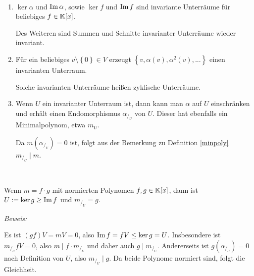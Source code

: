 \begin{mylemma} \label{lemdef3.2}\

    \begin{enumerate}
        \item $\ker \alpha$ und $\text{Im}\, \alpha$, sowie $\ker f$ und $\text{Im}\, f$  sind invariante Unterräume für beliebiges $f \in \mathbb{K}[x]$.

            Des Weiteren sind Summen und Schnitte invarianter Unterräume wieder invariant.
        \item \label{lemdef3.2-2} Für ein beliebiges $v \setminus \left\{ 0 \right\} \in V$ erzeugt $\left\{ v,\alpha(v),\alpha^2(v),... \right\}$ einen invarianten Unterraum.

            Solche invarianten Unterräume heißen zyklische Unterräume.
        \item Wenn $U$ ein invarianter Unterraum ist, dann kann man $\alpha$ auf $U$ einschränken und erhält einen Endomorphismus $\alpha_{/_U}$ von 
            $U$. Dieser hat ebenfalls ein Minimalpolynom, etwa $m_U$.

            Da $m(\alpha_{/_U}) = 0$ ist, folgt aus der Bemerkung zu Definition \ref{minpoly} $m_{/_U} \mid m$.
    \end{enumerate}
\end{mylemma}


\begin{mylemma}\label{m=f*g}\

    Wenn $m = f\cdot g$ mit normierten Polynomen $f, g \in \mathbb{K}[x]$, dann ist $U := \ker g \geq \text{Im}\, f$ und $m_{/_U} = g$.

    \textit{Beweis:}

    Es ist $(gf)V = mV = 0$, also $\text{Im}\, f = fV \leq \ker g=U$. Insbesondere ist $m_{/_U} fV = 0$, also $m \mid f \cdot m_{/_U}$ und daher auch $g \mid m_{/_U}$.
    Andererseits ist $g(\alpha_{/_U})=0$ nach Definition von $U$, also $m_{/_U} \mid g$. Da beide Polynome normiert sind, folgt die Gleichheit.
\end{mylemma}



